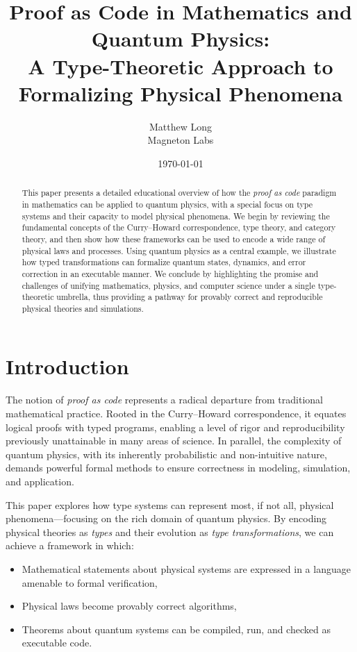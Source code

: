 \documentclass[12pt]{article}
\title{\bf Proof as Code in Mathematics and Quantum Physics:\\
A Type-Theoretic Approach to Formalizing Physical Phenomena}
\author{Matthew Long \\
Magneton Labs}
\date{\today}
\begin{document}
\maketitle

\begin{abstract}
\noindent
This paper presents a detailed educational overview of how the \emph{proof as code} paradigm in mathematics can be applied to quantum physics, with a special focus on type systems and their capacity to model physical phenomena. We begin by reviewing the fundamental concepts of the Curry--Howard correspondence, type theory, and category theory, and then show how these frameworks can be used to encode a wide range of physical laws and processes. Using quantum physics as a central example, we illustrate how typed transformations can formalize quantum states, dynamics, and error correction in an executable manner. We conclude by highlighting the promise and challenges of unifying mathematics, physics, and computer science under a single type-theoretic umbrella, thus providing a pathway for provably correct and reproducible physical theories and simulations.
\end{abstract}

\tableofcontents

\newpage

\section{Introduction}
\label{sec:intro}
The notion of \emph{proof as code} represents a radical departure from traditional mathematical practice. Rooted in the Curry--Howard correspondence, it equates logical proofs with typed programs, enabling a level of rigor and reproducibility previously unattainable in many areas of science. In parallel, the complexity of quantum physics, with its inherently probabilistic and non-intuitive nature, demands powerful formal methods to ensure correctness in modeling, simulation, and application.

This paper explores how type systems can represent most, if not all, physical phenomena---focusing on the rich domain of quantum physics. By encoding physical theories as \emph{types} and their evolution as \emph{type transformations}, we can achieve a framework in which:
\begin{itemize}[label=$\bullet$]
    \item Mathematical statements about physical systems are expressed in a language amenable to formal verification,
    \item Physical laws become provably correct algorithms,
    \item Theorems about quantum systems can be compiled, run, and checked as executable code.
\end{itemize}
\end{document}
